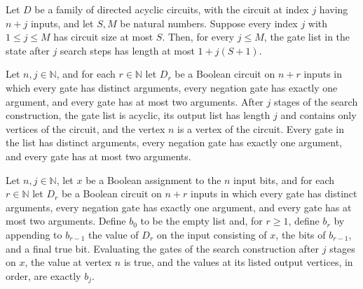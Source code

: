 \begin{theorem}
\label{BoolCircuit.length_searchState_le}
\leanok
{}
Let $D$ be a family of directed acyclic circuits, with the circuit at index $j$ having
$n+j$ inputs, and let $S,M$ be natural numbers. Suppose every index $j$ with $1\le j\le
M$ has circuit size at most $S$. Then, for every $j\le M$, the gate list in the state
after $j$ search steps has length at most $1+j(S+1)$.
\end{theorem}

\begin{theorem}
\label{BoolCircuit.searchState_struct}
\leanok
{}
Let $n,j\in\mathbb{N}$, and for each $r\in\mathbb{N}$ let $D_r$ be a Boolean circuit on
$n+r$ inputs in which every gate has distinct arguments, every negation gate has exactly
one argument, and every gate has at most two arguments. After $j$ stages of the search
construction, the gate list is acyclic, its output list has length $j$ and contains only
vertices of the circuit, and the vertex $n$ is a vertex of the circuit. Every gate in
the list has distinct arguments, every negation gate has exactly one argument, and every
gate has at most two arguments.
\end{theorem}

\begin{theorem}
\label{BoolCircuit.searchState_values}
\leanok
{}
Let $n,j\in\mathbb{N}$, let $x$ be a Boolean assignment to the $n$ input bits, and for
each $r\in\mathbb{N}$ let $D_r$ be a Boolean circuit on $n+r$ inputs in which every gate
has distinct arguments, every negation gate has exactly one argument, and every gate has
at most two arguments. Define $b_0$ to be the empty list and, for $r\ge1$, define $b_r$
by appending to $b_{r-1}$ the value of $D_r$ on the input consisting of $x$, the bits of
$b_{r-1}$, and a final true bit. Evaluating the gates of the search construction after
$j$ stages on $x$, the value at vertex $n$ is true, and the values at its listed output
vertices, in order, are exactly $b_j$.
\end{theorem}

